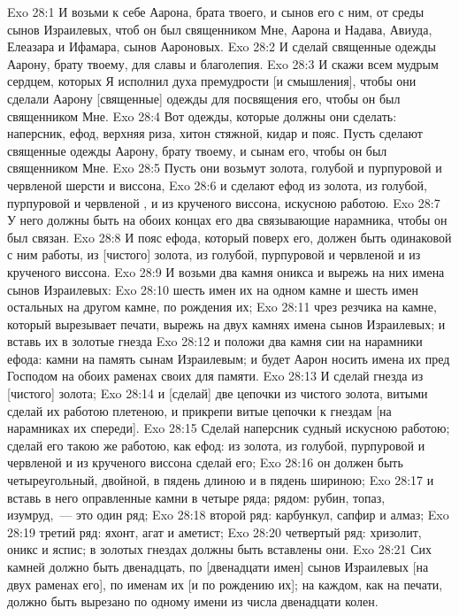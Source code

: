 \vs Exo 28:1 И возьми к себе Аарона, брата твоего, и сынов его с ним, от среды сынов Израилевых, чтоб он был священником Мне, Аарона и Надава, Авиуда, Елеазара и Ифамара, сынов Аароновых.
\vs Exo 28:2 И сделай священные одежды Аарону, брату твоему, для славы и благолепия.
\vs Exo 28:3 И скажи всем мудрым сердцем, которых Я исполнил духа премудрости [и смышления], чтобы они сделали Аарону [священные] одежды для посвящения его, чтобы он был священником Мне.
\rsbpar\vs Exo 28:4 Вот одежды, которые должны они сделать: наперсник, ефод, верхняя риза, хитон стяжной, кидар и пояс. Пусть сделают священные одежды Аарону, брату твоему, и сынам его, чтобы он был священником Мне.
\vs Exo 28:5 Пусть они возьмут золота, голубой и пурпуровой и червленой шерсти и виссона,
\vs Exo 28:6 и сделают ефод из золота, из голубой, пурпуровой и червленой , и из крученого виссона, искусною работою.
\vs Exo 28:7 У него должны быть на обоих концах его два связывающие нарамника, чтобы он был связан.
\vs Exo 28:8 И пояс ефода, который поверх его, должен быть одинаковой с ним работы, из [чистого] золота, из голубой, пурпуровой и червленой  и из крученого виссона.
\vs Exo 28:9 И возьми два камня оникса и вырежь на них имена сынов Израилевых:
\vs Exo 28:10 шесть имен их на одном камне и шесть имен остальных на другом камне, по  рождения их;
\vs Exo 28:11 чрез резчика на камне, который вырезывает печати, вырежь на двух камнях имена сынов Израилевых; и вставь их в золотые гнезда
\vs Exo 28:12 и положи два камня сии на нарамники ефода:  камни на память сынам Израилевым; и будет Аарон носить имена их пред Господом на обоих раменах своих для памяти.
\vs Exo 28:13 И сделай гнезда из [чистого] золота;
\vs Exo 28:14 и [сделай] две цепочки из чистого золота, витыми сделай их работою плетеною, и прикрепи витые цепочки к гнездам [на нарамниках их спереди].
\rsbpar\vs Exo 28:15 Сделай наперсник судный искусною работою; сделай его такою же работою, как ефод: из золота, из голубой, пурпуровой и червленой  и из крученого виссона сделай его;
\vs Exo 28:16 он должен быть четыреугольный, двойной, в пядень длиною и в пядень шириною;
\vs Exo 28:17 и вставь в него оправленные камни в четыре ряда; рядом: рубин, топаз, изумруд,~--- это один ряд;
\vs Exo 28:18 второй ряд: карбункул, сапфир и алмаз;
\vs Exo 28:19 третий ряд: яхонт, агат и аметист;
\vs Exo 28:20 четвертый ряд: хризолит, оникс и яспис; в золотых гнездах должны быть вставлены они.
\vs Exo 28:21 Сих камней должно быть двенадцать, по  [двенадцати имен] сынов Израилевых [на двух раменах его], по именам их [и по рождению их]; на каждом, как на печати, должно быть вырезано по одному имени из числа двенадцати колен.
